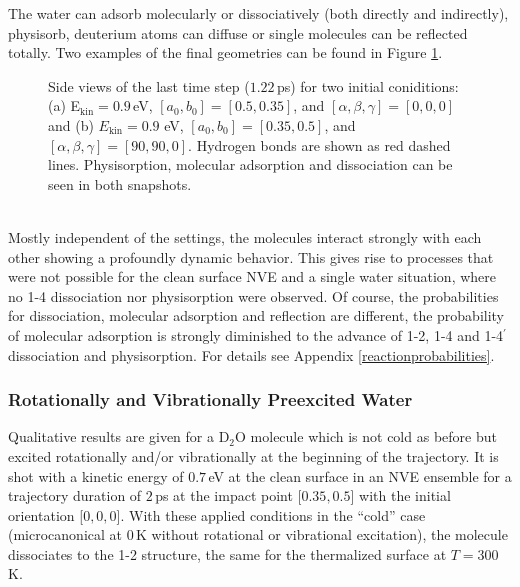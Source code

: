\documentclass[11pt,DIV=13,BCOR=5mm,a4paper,headinclude]{scrbook}
\begin{document}
The water can adsorb molecularly or dissociatively (both directly and indirectly), physisorb, deuterium atoms can diffuse or single molecules can be reflected totally.
Two examples of the final geometries can be found in Figure \ref{abb:tetramer_traj}.
\begin{figure}[!ht]
\centering
{} 
\quad
{}
\caption{Side views of the last time step ($1.22\,$ps) for two initial coniditions: (a) E$_\textrm{kin}=0.9\,$eV, $[a_0,b_0]=[0.5,0.35]$, and $[\alpha,\beta,\gamma]=[0,0,0]$ and (b)  $E_\textrm{kin}=0.9$ eV, $[a_0,b_0]=[0.35,0.5]$, 
 and $[\alpha,\beta,\gamma]=[90,90,0]$.
Hydrogen bonds are shown as red dashed lines.
Physisorption, molecular adsorption and dissociation can be seen in both snapshots.}
\label{abb:tetramer_traj}
\end{figure}
\\

Mostly independent of the settings, the molecules interact strongly with each other showing a profoundly dynamic behavior.
This gives rise to processes that were not possible for the clean surface NVE and a single water situation, where no 1-4 dissociation nor physisorption were observed.
Of course, the probabilities for dissociation, molecular adsorption and reflection are different, the probability of molecular adsorption is strongly diminished to the advance of 1-2, 1-4 and 1-4$^\prime$ dissociation and physisorption.
For details see Appendix \ref{reactionprobabilities}.

\subsubsection{Rotationally and Vibrationally Preexcited Water}\label{preex}
Qualitative results are given for a D$_2$O molecule which is not cold as before but excited rotationally and/or vibrationally at the beginning of the trajectory.
It is shot with a kinetic energy of $0.7\,$eV at the clean surface in an NVE ensemble for a trajectory duration of $2\,$ps at the impact point [$0.35,0.5$] with the initial orientation [$0,0,0$].
With these applied conditions in the ``cold'' case (microcanonical at $0\,$K without rotational or vibrational excitation), the molecule dissociates to the 1-2 structure, the same for the thermalized surface at $T=300\,$K.
\end{document}
